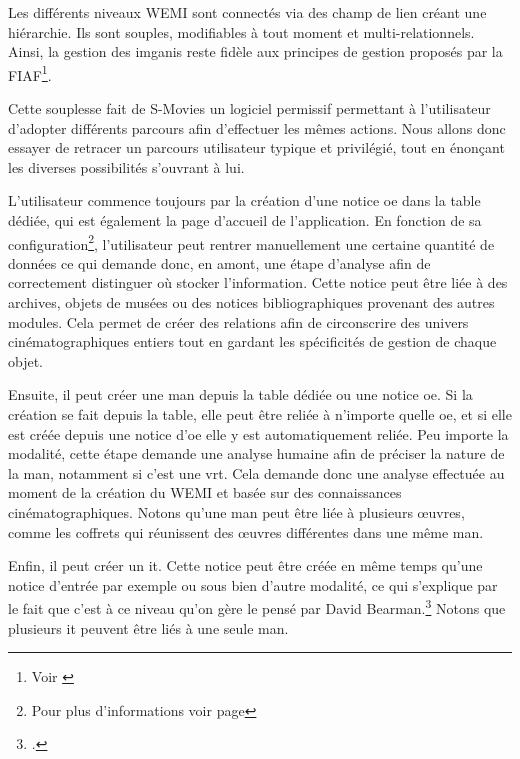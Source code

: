 Les différents niveaux \gls{WEMI} sont connectés via des champ de lien créant une hiérarchie. Ils sont souples, modifiables à tout moment et multi-relationnels. Ainsi, la gestion des \glspl{imgani} reste fidèle aux principes de gestion proposés par la \gls{FIAF}\footnote{Voir \cite{fairbairnManuelCatalogageImages}}.\newline

Cette souplesse fait de S-Movies un logiciel permissif permettant à l'utilisateur d'adopter différents parcours afin d'effectuer les mêmes actions. Nous allons donc essayer de retracer un parcours utilisateur typique et privilégié, tout en énonçant les diverses possibilités s'ouvrant à lui.

L'utilisateur commence toujours par la création d'une notice \gls{oe} dans la \gls{table} dédiée, qui est également la page d'accueil de l'application. En fonction de sa configuration\footnote{Pour plus d'informations voir page \pageref{module}}, l'utilisateur peut rentrer manuellement une certaine quantité de données ce qui demande donc, en amont, une étape d'analyse afin de correctement distinguer où stocker l'information. Cette notice peut être liée à des archives, objets de musées ou des notices bibliographiques provenant des autres modules. Cela permet de créer des relations afin de circonscrire des univers cinématographiques entiers tout en gardant les spécificités de gestion de chaque objet.\newline

Ensuite, il peut créer une \gls{man} depuis la table dédiée ou une notice \gls{oe}. Si la création se fait depuis la table, elle peut être reliée à n'importe quelle \gls{oe}, et si elle est créée depuis une notice d'\gls{oe} elle y est automatiquement reliée. Peu importe la modalité, cette étape demande une analyse humaine afin de préciser la nature de la \gls{man}, notamment si c'est une \gls{vrt}. Cela demande donc une analyse effectuée au moment de la création du \gls{WEMI} et basée sur des connaissances cinématographiques. Notons qu'une \gls{man} peut être liée à plusieurs \oe{uvres}, comme les coffrets qui réunissent des \oe{uvres} différentes dans une même \gls{man}.\newline

Enfin, il peut créer un \gls{it}. Cette notice peut être créée en même temps qu'une notice d'entrée par exemple ou sous bien d'autre modalité, ce qui s'explique par le fait que c'est à ce niveau qu'on gère le  pensé par David Bearman.\footcite{ArchivesMuseumInformatics} Notons que plusieurs \gls{it} peuvent être liés à une seule \gls{man}.


